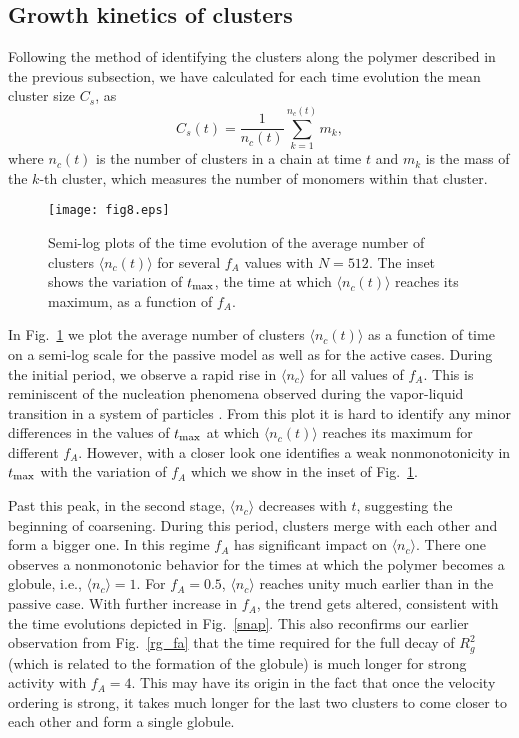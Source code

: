 \documentclass[aps,prx,reprint,showpacs,showkeys,noeprint,longbibliography]{revtex4-1} %
\begin{document}
\subsection{Growth kinetics of clusters}
\par
Following the method of identifying the clusters along the polymer described in the previous subsection, we have calculated for each time evolution the mean cluster size $C_s$, as 
\begin{equation}
	C_s(t) = \frac{1}{n_c(t)} \sum_{k=1}^{n_c(t)} m_k,
\end{equation}
where $n_c(t)$ is the number of clusters in a chain at time $t$ and $m_k$ 
is the mass of the $k$-th cluster, which  measures the number of monomers 
within that cluster. 
\begin{figure}[t!]
	\centering
	\texttt{[image: fig8.eps]}
	\caption{\label{nc_t} Semi-log plots of the time evolution of the average number of clusters  $\langle n_c(t) \rangle$ for several
		$f_A$ values with $N=512$. The inset shows the variation of $t_{\rm{max}}$, 
		the time at which $\langle n_c(t) \rangle$ reaches its maximum, as a function of $f_A$.}
\end{figure}
\par 
In Fig.~\ref{nc_t} we plot the average number of clusters $\langle n_c(t) \rangle$ as a function of 
time on a semi-log scale for the passive model as well as for the active cases. During the initial period, we observe a rapid rise in $ \langle n_c \rangle$ for all values of $f_A$. This is reminiscent of the nucleation phenomena observed during the vapor-liquid transition in a system of particles \cite{roy_13}. 
From this plot it is hard to identify any minor differences in the values of  $t_{\rm{max}}$ 
at which $\langle n_c(t) \rangle$ reaches its maximum for different $f_A$. However, with a closer look one identifies a weak nonmonotonicity in $t_{\rm{max}}$ with the variation of $f_A$ which we show in the inset of Fig.~\ref{nc_t}. 
\par 
Past this peak, in the second stage, $ \langle n_c \rangle$ decreases with $t$, suggesting the beginning of coarsening. During this period, clusters merge with each other and form a bigger one. In this regime $f_A$ has significant impact on $\langle n_c \rangle$. There one observes a nonmonotonic behavior for the times at which the polymer becomes a globule, i.e., $\langle n_c \rangle=1$. For $f_A=0.5$, $ \langle n_c \rangle$ reaches unity much earlier than in the passive case. With further increase in $f_A$, the trend gets altered, consistent with the time evolutions depicted in Fig.~\ref{snap}. This also reconfirms our earlier observation from Fig.~\ref{rg_fa} that the time required for the full decay of $R_g^2$ (which is related to the formation of the globule) is much longer for strong activity with $f_A=4$. This may have its origin in the fact that once the velocity ordering is strong, it takes much longer for the last two clusters to come closer to each other and form a single globule.
\end{document}

